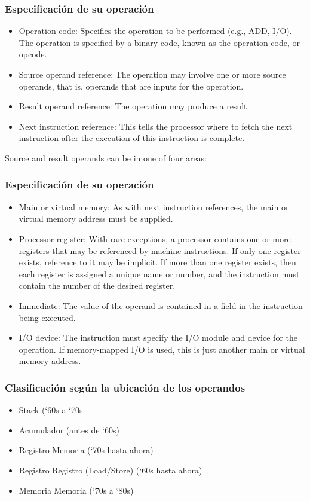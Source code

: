 \subsubsection{Especificación de su operación}
\begin{itemize}
\item Operation code: Specifies the operation to be performed (e.g., ADD, I/O). The operation is specified by a binary code, known as the operation code, or opcode.
\item  Source operand reference: The operation may involve one or more source operands, that is, operands that are inputs for the operation.
\item  Result operand reference: The operation may produce a result.
\item  Next instruction reference: This tells the processor where to fetch the next
instruction after the execution of this instruction is complete.
\end{itemize}

Source and result operands can be in one of four areas:
\subsubsection{Especificación de su operación}
\begin{itemize}
\item Main or virtual memory: As with next instruction references, the main or virtual memory address must be supplied.
\item  Processor register: With rare exceptions, a processor contains one or more registers that may be referenced by machine instructions. If only one register exists, reference to it may be implicit. If more than one register exists, then each register is assigned a unique name or number, and the instruction must contain the number of the desired register.
\item  Immediate: The value of the operand is contained in a field in the instruction being executed.
\item  I/O device: The instruction must specify the I/O module and device for the operation. If memory-mapped I/O is used, this is just another main or virtual memory address.
\end{itemize}

\subsubsection{Clasificación según la ubicación de los operandos}
\begin{itemize}
\item Stack (‘60s a ‘70s
\item Acumulador (antes de ‘60s)
\item Registro Memoria (‘70s hasta ahora)
\item Registro Registro (Load/Store) (‘60s hasta ahora)
\item Memoria Memoria (‘70s a ‘80s)
\end{itemize}

